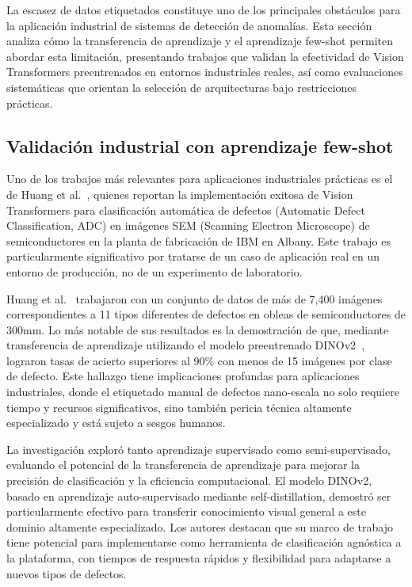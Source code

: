 La escasez de datos etiquetados constituye uno de los principales obstáculos para la aplicación industrial de sistemas de detección de anomalías. Esta sección analiza cómo la transferencia de aprendizaje y el aprendizaje few-shot permiten abordar esta limitación, presentando trabajos que validan la efectividad de Vision Transformers preentrenados en entornos industriales reales, así como evaluaciones sistemáticas que orientan la selección de arquitecturas bajo restricciones prácticas.

\subsection{Validación industrial con aprendizaje few-shot}

Uno de los trabajos más relevantes para aplicaciones industriales prácticas es el de Huang et al.~\cite{huang2025semiconductor}, quienes reportan la implementación exitosa de Vision Transformers para clasificación automática de defectos (Automatic Defect Classification, ADC) en imágenes SEM (Scanning Electron Microscope) de semiconductores en la planta de fabricación de IBM en Albany. Este trabajo es particularmente significativo por tratarse de un caso de aplicación real en un entorno de producción, no de un experimento de laboratorio.

Huang et al.~\cite{huang2025semiconductor} trabajaron con un conjunto de datos de más de 7,400 imágenes correspondientes a 11 tipos diferentes de defectos en obleas de semiconductores de 300mm. Lo más notable de sus resultados es la demostración de que, mediante transferencia de aprendizaje utilizando el modelo preentrenado DINOv2~\cite{oquab2024dinov2}, lograron tasas de acierto superiores al 90\% con menos de 15 imágenes por clase de defecto. Este hallazgo tiene implicaciones profundas para aplicaciones industriales, donde el etiquetado manual de defectos nano-escala no solo requiere tiempo y recursos significativos, sino también pericia técnica altamente especializado y está sujeto a sesgos humanos.

La investigación exploró tanto aprendizaje supervisado como semi-supervisado, evaluando el potencial de la transferencia de aprendizaje para mejorar la precisión de clasificación y la eficiencia computacional. El modelo DINOv2, basado en aprendizaje auto-supervisado mediante self-distillation, demostró ser particularmente efectivo para transferir conocimiento visual general a este dominio altamente especializado. Los autores destacan que su marco de trabajo tiene potencial para implementarse como herramienta de clasificación agnóstica a la plataforma, con tiempos de respuesta rápidos y flexibilidad para adaptarse a nuevos tipos de defectos.

